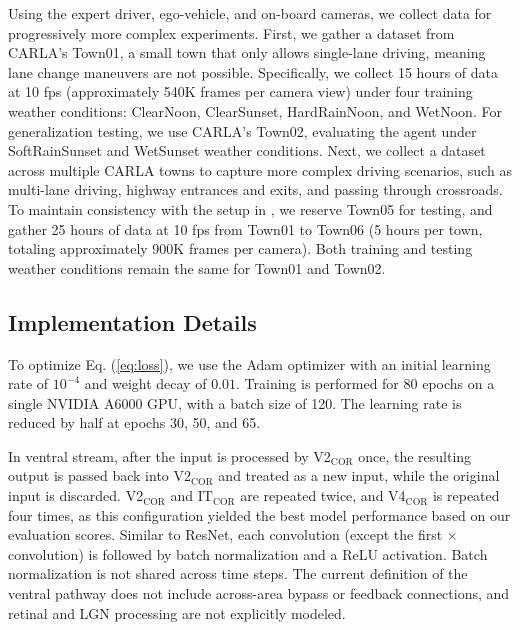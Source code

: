 Using the expert driver, ego-vehicle, and on-board cameras, we collect data for progressively more complex experiments.
First, we gather a dataset from CARLA's Town01, a small town that only allows single-lane driving, meaning lane change maneuvers are not possible.  
Specifically, we collect 15 hours of data at 10 fps (approximately 540K frames per camera view) under four training weather conditions: ClearNoon, ClearSunset, HardRainNoon, and WetNoon. 
For generalization testing, we use CARLA's Town02, evaluating the agent under SoftRainSunset and WetSunset weather conditions. 
Next, we collect a dataset across multiple CARLA towns to capture more complex driving scenarios, such as multi-lane driving, highway entrances and exits, and passing through crossroads. 
To maintain consistency with the setup in \cite{Hu:2022}, we reserve Town05 for testing, and gather 25 hours of data at 10 fps from Town01 to Town06 (5 hours per town, totaling approximately 900K frames per camera). 
Both training and testing weather conditions remain the same for Town01 and Town02.



\subsection{Implementation Details}

\hspace{1pc}To optimize Eq. (\ref{eq:loss}), we use the Adam optimizer \cite{Kingma:2015} with an initial learning rate of $10^{-4}$ and weight decay of $0.01$. 
Training is performed for 80 epochs on a single NVIDIA A6000 GPU, with a batch size of 120.
The learning rate is reduced by half at epochs 30, 50, and 65.


In ventral stream, after the input is processed by V2$_\text{COR}$ once, the resulting output is passed back into V2$_\text{COR}$ and treated as a new input, while the original input is discarded.
V2$_\text{COR}$ and IT$_\text{COR}$ are repeated twice, and V4$_\text{COR}$ is repeated four times, as this configuration yielded the best model performance based on our evaluation scores.
Similar to ResNet, each convolution (except the first $ \times $ convolution) is followed by batch normalization and a ReLU activation.
Batch normalization is not shared across time steps.
The current definition of the ventral pathway does not include across-area bypass or feedback connections, and retinal and LGN processing are not explicitly modeled.


